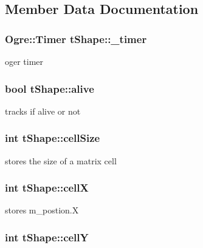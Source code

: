 \subsection{Member Data Documentation}
\hypertarget{classt_shape_ade6208b0cd2a248227f8ac43e3c3b494}{
\subsubsection[{\-\_\-timer}]{\setlength{\rightskip}{0pt plus 5cm}Ogre\-::\-Timer t\-Shape\-::\-\_\-timer}}\label{classt_shape_ade6208b0cd2a248227f8ac43e3c3b494}
oger timer \hypertarget{classt_shape_a1bb379051554beb845b42fb441e0939c}{
\subsubsection[{alive}]{\setlength{\rightskip}{0pt plus 5cm}bool t\-Shape\-::alive}}\label{classt_shape_a1bb379051554beb845b42fb441e0939c}
tracks if alive or not \hypertarget{classt_shape_a1692503641320662db249899a96465f4}{
\subsubsection[{cell\-Size}]{\setlength{\rightskip}{0pt plus 5cm}int t\-Shape\-::cell\-Size}}\label{classt_shape_a1692503641320662db249899a96465f4}
stores the size of a matrix cell \hypertarget{classt_shape_afe93811926d8189ec7a05f3837946d13}{
\subsubsection[{cell\-X}]{\setlength{\rightskip}{0pt plus 5cm}int t\-Shape\-::cell\-X}}\label{classt_shape_afe93811926d8189ec7a05f3837946d13}
stores m\-\_\-postion.\-X \hypertarget{classt_shape_ac6f6ca34dbe77edc42bf1063f45704f3}{
\subsubsection[{cell\-Y}]{\setlength{\rightskip}{0pt plus 5cm}int t\-Shape\-::cell\-Y}}\label{classt_shape_ac6f6ca34dbe77edc42bf1063f45704f3}

